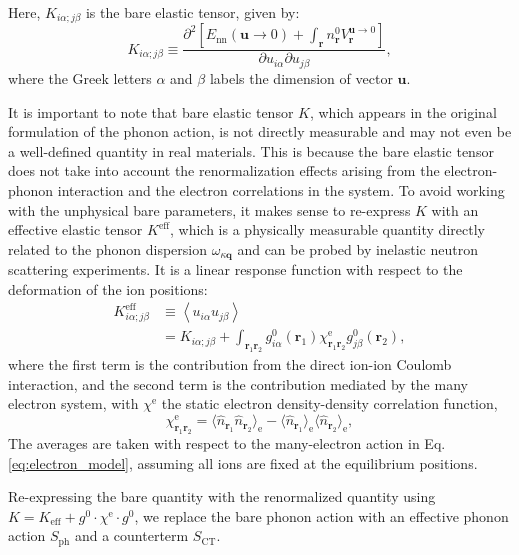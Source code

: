 \documentclass[%
 reprint,
superscriptaddress,
 amsmath,amssymb,
 aps,
prx,
]{revtex4-2}
\newcommand{\br}{\mathbf{r}}
\newcommand{\bq}{\mathbf{q}}
\newcommand{\bu}{\mathbf{u}}
\newcommand{\txe}{\text{e}}
\newcommand{\txnn}{\text{nn}}
\newcommand{\txph}{\text{ph}}
\newcommand{\txeff}{\text{eff}}
\newcommand{\txCT}{\text{CT}}
\begin{document}
\begin{appendices}
Here, $K_{i\alpha;j\beta}$ is the bare elastic tensor, given by: 
\begin{equation}
  K_{i\alpha;j\beta} \equiv \frac{\partial^2 \left[E_{\txnn}\left( \bu \rightarrow 0\right) +\int_\br n^0_\br V^{\bu\rightarrow 0}_{\br}\right]}{\partial u_{i\alpha}\partial u_{j\beta}},
\end{equation}
where the Greek letters $\alpha$ and $\beta$ labels the dimension of vector $\bu$. 

It is important to note that bare elastic tensor $K$, which appears in the original formulation of the phonon action, is not directly measurable and may not even be a well-defined quantity in real materials. This is because the bare elastic tensor does not take into account the renormalization effects arising from the electron-phonon interaction and the electron correlations in the system. To avoid working with the unphysical bare parameters, it makes sense to re-express $K$ with an effective elastic tensor $K^{\txeff}$, which is a physically measurable quantity directly related to the phonon dispersion $\omega_{\kappa\bq}$ and can be probed by inelastic neutron scattering experiments. It is a linear response function with respect to the deformation of the ion positions:
\begin{align}
    K^{\txeff}_{i\alpha; j\beta} &\equiv \left< u_{i\alpha} u_{j\beta}\right> \\
    &= K_{i\alpha; j\beta}+\int_{\br_1\br_2} g^0_{i\alpha}\left( \br_1 \right)
  \chi^\txe_{\br_1\br_2} g^0_{j\beta}\left( \br_2 \right),
\end{align}
where the first term is the contribution from the direct ion-ion Coulomb interaction, and the second term is the contribution mediated by the many electron system, with $\chi^\txe$ the static electron density-density correlation function,
\begin{equation}
    \chi^\txe_{\br_1\br_2} =\langle \hat{n}_{\br_1}\hat{n}_{\br_2}\rangle_{\txe}-\langle \hat{n}_{\br_1}\rangle_\txe \langle\hat{n}_{\br_2}\rangle_\txe,
\end{equation}
The averages are taken with respect to the many-electron action in Eq.\eqref{eq:electron_model}, assuming all ions are fixed at the equilibrium positions. 

Re-expressing the bare quantity with the renormalized quantity using $K = K_{\txeff}+g^0\cdot \chi^\txe\cdot g^0$, we replace the bare phonon action with an effective phonon action $S_{\txph}$ and a counterterm $S_{\txCT}$.


\end{appendices}
\end{document}
